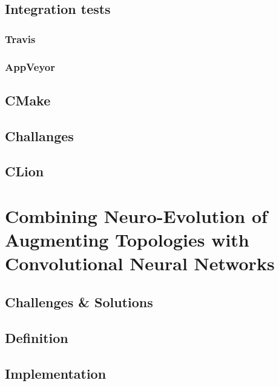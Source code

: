\documentclass[11pt]{article}
\begin{document}
		\subsection{Integration tests}
			
			\subsubsection{Travis}
				
			\subsubsection{AppVeyor}
				
		\subsection{CMake}
			
		\subsection{Challanges}
			\subsection{CLion}
				
	\newpage

	\section{Combining Neuro-Evolution of Augmenting Topologies with Convolutional Neural Networks}
		\subsection{Challenges \& Solutions}
			
		\subsection{Definition}
			
		\subsection{Implementation}
			
	\newpage
\end{document}
